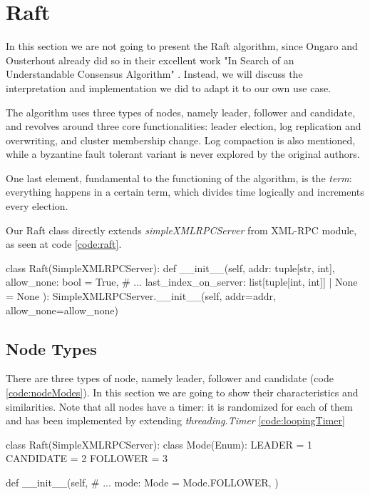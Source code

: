 \section{Raft} \label{sec:raft}

In this section we are not going to present the Raft algorithm, since Ongaro and Ousterhout already did so in their excellent work "In Search of an Understandable Consensus Algorithm" \cite{raft}. Instead, we will discuss the interpretation and implementation we did to adapt it to our own use case.

The algorithm uses three types of nodes, namely leader, follower and candidate, and revolves around three core functionalities: leader election, log replication and overwriting, and cluster membership change. Log compaction is also mentioned, while a byzantine fault tolerant variant is never explored by the original authors.

One last element, fundamental to the functioning of the algorithm, is the \textit{term}: everything happens in a certain term, which divides time logically and increments every election. 

Our Raft class directly extends \textit{simpleXMLRPCServer} from XML-RPC module, as seen at code \ref{code:raft}.

\label{code:raft}
\begin{python} 
class Raft(SimpleXMLRPCServer):
    def __init__(self, 
                 addr: tuple[str, int],
                 allow_none: bool = True,
                 # ...
                 last_index_on_server: list[tuple[int, int]] | None = None
                 ):
        SimpleXMLRPCServer.__init__(self, addr=addr, allow_none=allow_none)
\end{python}

\subsection{Node Types} \label{sec:nodes}

There are three types of node, namely leader, follower and candidate (code \ref{code:nodeModes}). In this section we are going to show their characteristics and similarities. Note that all nodes have a timer: it is randomized for each of them and has been implemented by extending \textit{threading.Timer} \ref{code:loopingTimer}

\label{code:nodeModes}
\begin{python} 
class Raft(SimpleXMLRPCServer):
    class Mode(Enum):
        LEADER = 1
        CANDIDATE = 2
        FOLLOWER = 3
                
    def __init__(self, 
                 # ...
                 mode: Mode = Mode.FOLLOWER,
                 )
\end{python}

